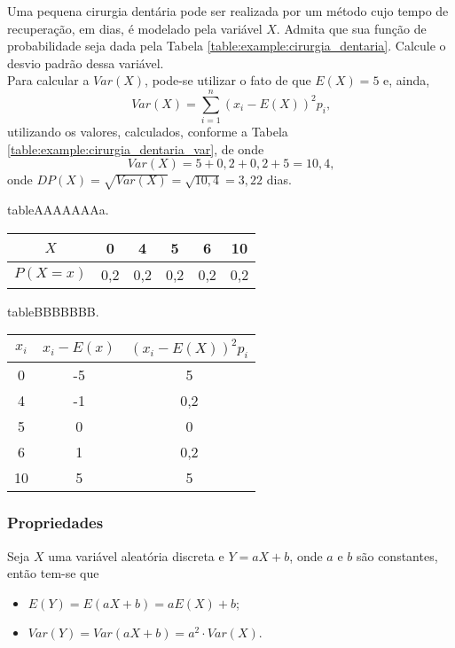\begin{example}
	Uma pequena cirurgia dentária pode ser realizada por um método cujo tempo de recuperação, em dias, é modelado pela variável $X$. Admita que sua função de probabilidade seja dada pela Tabela \ref{table:example:cirurgia_dentaria}. Calcule o desvio padrão dessa variável.\\

	Para calcular a $Var(X)$, pode-se utilizar o fato de que $E(X)=5$ e, ainda,
	\[
		Var(X)=\sum_{i=1}^{n} (x_i - E(X))^2 p_i\text{,}
	\]
	utilizando os valores, calculados, conforme a Tabela \ref{table:example:cirurgia_dentaria_var}, de onde
	\[
		Var(X)=5+0,2+0,2+5=10,4\text{,}
	\]
	onde $DP(X)=\sqrt{Var(X)}=\sqrt{10,4}=3,22$ dias.
\end{example}

\begin{sidepicture}{9cm}{table}{AAAAAAAa.}
	\label{table:example:cirurgia_dentaria}
	\begin{tabular}{c|ccccc}
		$X$ & 0 & 4 & 5 & 6 & 10 \\ \toprule
		$P(X=x)$ & 0,2 & 0,2 & 0,2 & 0,2 & 0,2 \\
	\end{tabular}
\end{sidepicture}

\begin{sidepicture}{6cm}{table}{BBBBBBB.}
	\label{table:example:cirurgia_dentaria_var}
	\begin{tabular}{c|c|c}
		$x_i$ & $x_i-E(x)$ & $(x_i-E(X))^2p_i$ \\ \toprule
		0 & -5 & 5 \\
		4 & -1 & 0,2 \\
		5 & 0 & 0 \\
		6 & 1 & 0,2 \\
		10 & 5 & 5 \\
	\end{tabular}
\end{sidepicture}

\subsubsection*{Propriedades}

\begin{theorem}
	Seja $X$ uma variável aleatória discreta e $Y=aX+b$, onde $a$ e $b$ são constantes, então tem-se que
	\begin{itemize}
		\item $E(Y)=E(aX+b)=aE(X)+b$;
		\item $Var(Y)=Var(aX+b)=a^2\cdot Var(X)$.
	\end{itemize}
\end{theorem}

